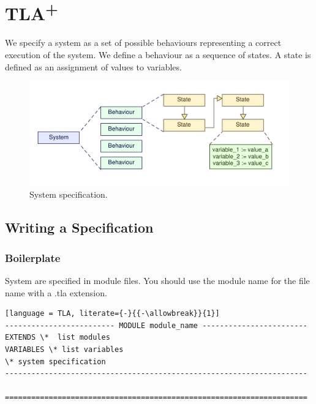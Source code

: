 
\chapter{TLA\textsuperscript{+}} %

\label{TLA+} %

We specify a system as a set of possible behaviours representing a correct execution
of the system. We define a behaviour as a sequence of states. A state is defined
as an assignment of values to variables. 

\begin{figure}[H]
	\centering
	\includegraphics[scale=0.75]{Figures/System_Specification.pdf}
	\decoRule
	\caption{System specification.}
	\label{fig:SysSpec}
\end{figure}

\section{Writing a Specification}

\subsection{Boilerplate}
System are specified in module files. You should use the module name for the file name with a .tla extension.

\begin{lstlisting}[language = TLA, literate={-}{{-\allowbreak}}{1}]
------------------------- MODULE module_name ------------------------
EXTENDS \*  list modules
VARIABLES \* list variables
\* system specification
---------------------------------------------------------------------

=====================================================================
\end{lstlisting}

